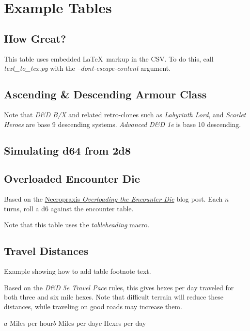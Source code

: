 \documentclass[bg=full, a4paper, 10pt, twoside, twocolumn, openany, nodeprecatedcode]{dndbook}
\begin{document}
\section{Example Tables}

\subsection{How Great?}
This table uses embedded \LaTeX\ markup in the CSV. To do this, call \emph{text\_to\_tex.py} with
the \emph{--dont-escape-content} argument.


\subsection{Ascending \& Descending Armour Class}\label{gm:ac_conversion}
Note that \emph{D\&D B/X} and related retro-clones such as \emph{Labyrinth
Lord}, and \emph{Scarlet Heroes} are base 9 descending systems. \emph{Advanced
D\&D 1e} is base 10 descending.



\subsection{Simulating d64 from 2d8}


\vfill\pagebreak

\subsection{Overloaded Encounter Die}\label{ex:random_encounters}
Based on the
\href{https://www.necropraxis.com/2014/02/03/overloading-the-encounter-die/}{Necropraxis
\emph{Overloading the Encounter Die}} blog post. Each $n$ turns, roll a d6 against the
encounter table.

\begin{DndComment}{}
Note that this table uses the \emph{tableheading} macro.
\end{DndComment}



\subsection{Travel Distances}\label{ex:travel_distances}
Example showing how to add table footnote text.

Based on the \emph{D\&D 5e Travel Pace} rules, this gives hexes per day traveled
for both three and six mile hexes. Note that difficult terrain will reduce these
distances, while traveling on good roads may increase them.

\begin{footnotesize}
\-\vspace{-3mm}\linebreak
\-\hspace{0mm}$a$ Miles per hour\hspace{5mm}$b$ Miles per day\hspace{5mm}$c$ Hexes per day
\end{footnotesize}

\vfill
\end{document}
